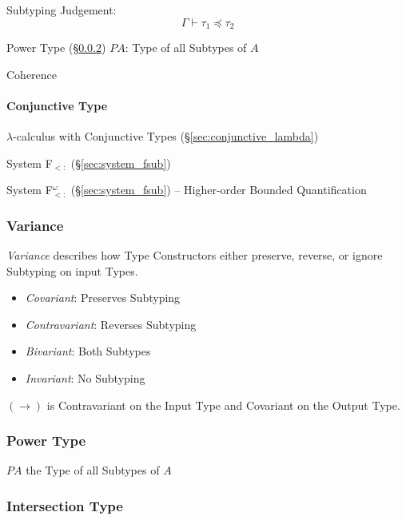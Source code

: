 Subtyping Judgement:
\[
  \Gamma \vdash \tau_1 \preceq \tau_2
\]

Power Type (\S\ref{sec:power_type}) $P A$: Type of all Subtypes of $A$

Coherence



\paragraph{Conjunctive Type}\label{sec:conjunctive_type}\hfill

$\lambda$-calculus with Conjunctive Types
(\S\ref{sec:conjunctive_lambda})

System F$_{<:}$ (\S\ref{sec:system_fsub})

System F$_{<:}^\omega$ (\S\ref{sec:system_fsub}) -- Higher-order
Bounded Quantification



\subsubsection{Variance}\label{sec:type_variance}

\emph{Variance} describes how Type Constructors either preserve,
reverse, or ignore Subtyping on input Types.

\begin{itemize}
  \item \emph{Covariant}: Preserves Subtyping
  \item \emph{Contravariant}: Reverses Subtyping
  \item \emph{Bivariant}: Both Subtypes
  \item \emph{Invariant}: No Subtyping
\end{itemize}

$(\rightarrow)$ is Contravariant on the Input Type and Covariant on
the Output Type.



\subsubsection{Power Type}\label{sec:power_type}

$P A$ the Type of all Subtypes of $A$



\subsubsection{Intersection Type}\label{sec:intersection_type}

